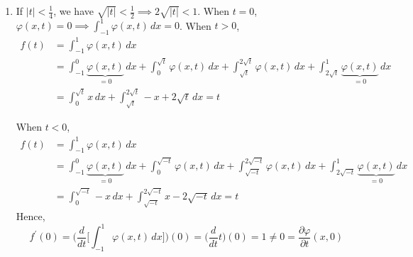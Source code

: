 \begin{solution}
\begin{enumerate}
				Since $\varphi(x, 0) = 0$, we know that for every $x \in \mathbb{R}$, there exists a neighborhood around $t = 0$ where $\varphi$ is constantly $0$ (and so dividing it by $h$ still gives $0$), which implies that $\lim_{h \to 0} \frac{\varphi(x, h)}{h} = \lim_{h \to 0} \frac{0}{h} = 0$. Therefore, the partial derivative evaluates to $0$ for every $x$. 

			\item If $|t| < \frac{1}{4}$, we have $\sqrt{|t|} < \frac{1}{2} \implies 2 \sqrt{|t|} < 1$. When $t = 0$, $\varphi(x, t) = 0 \implies \int_{-1}^1 \varphi(x, t) \,dx = 0$. When $t > 0$, 
				\begin{align}
					f(t) & = \int_{-1}^1 \varphi(x, t) \,dx \\ 
							 & = \int_{-1}^0 \underbrace{\varphi(x, t)}_{= 0} \,dx + \int_0^{\sqrt{t}} \varphi(x, t) \,dx + \int_{\sqrt{t}}^{2 \sqrt{t}} \varphi(x, t) \,dx + \int_{2 \sqrt{t}}^1 \underbrace{\varphi(x,t)}_{= 0} \,dx \\ 
							 & = \int_0^{\sqrt{t}} x \,dx + \int_{\sqrt{t}}^{2 \sqrt{t}} -x + 2 \sqrt{t} \,dx = t 
				\end{align}

				When $t < 0$, 
				\begin{align}
					f(t) & = \int_{-1}^1 \varphi(x, t) \,dx \\ 
							 & = \int_{-1}^0 \underbrace{\varphi(x, t)}_{= 0} \,dx + \int_0^{\sqrt{-t}} \varphi(x, t) \,dx + \int_{\sqrt{-t}}^{2 \sqrt{-t}} \varphi(x, t) \,dx + \int_{2 \sqrt{-t}}^1 \underbrace{\varphi(x,t)}_{= 0} \,dx \\ 
							 & = \int_0^{\sqrt{-t}} -x \,dx + \int_{\sqrt{-t}}^{2\sqrt{-t}} x - 2\sqrt{-t} \,dx = t
				\end{align}
				Hence, 
				\begin{equation}
					f^\prime (0) = \bigg( \frac{d}{dt} \bigg[ \int_{-1}^1 \varphi(x, t) \,dx \bigg] \bigg) (0) = \bigg( \frac{d}{dt} t \bigg)(0) = 1 \neq 0 = \frac{\partial \varphi}{\partial t} (x, 0) 
				\end{equation}
		\end{enumerate}
	\end{solution}


